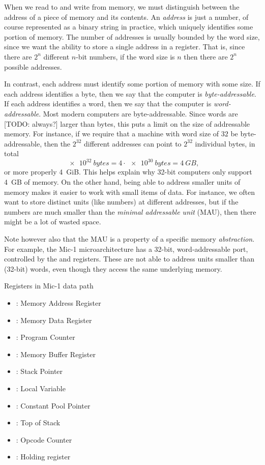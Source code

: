\documentclass[article, a4paper, 11pt, oneside]{memoir}
\numberwithin{equation}{chapter}
\begin{document}
\begin{notelist}
When we read to and write from memory, we must distinguish between the address of a piece of memory and its contents. An \emph{address} is just a number, of course represented as a binary string in practice, which uniquely identifies some portion of memory. The number of addresses is usually bounded by the word size, since we want the ability to store a single address in a register. That is, since there are $2^n$ different $n$-bit numbers, if the word size is $n$ then there are $2^n$ possible addresses.

In contrast, each address must identify some portion of memory with some size. If each address identifies a byte, then we say that the computer is \emph{byte-addressable}. If each address identifies a word, then we say that the computer is \emph{word-addressable}. Most modern computers are byte-addressable. Since words are [TODO: always?] larger than bytes, this puts a limit on the size of addressable memory. For instance, if we require that a machine with word size of $32$ be byte-addressable, then the $2^{32}$ different addresses can point to $2^{32}$ individual bytes, in total
%
\begin{equation*}
    \SI[exponent-base=2]{e32}{bytes}
        = 4 \cdot \SI[exponent-base=2]{e30}{bytes}
        = \SI{4}{GB},
\end{equation*}
%
or more properly \SI{4}{GiB}. This helps explain why 32-bit computers only support \SI{4}{GB} of memory. On the other hand, being able to address smaller units of memory makes it easier to work with small items of data. For instance, we often want to store distinct units (like numbers) at different addresses, but if the numbers are much smaller than the \emph{minimal addressable unit} (MAU), then there might be a lot of wasted space.

Note however also that the MAU is a property of a specific memory \emph{abstraction}. For example, the Mic-1 microarchitecture has a 32-bit, word-addressable port, controlled by the  and  registers. These are not able to address units smaller than (32-bit) words, even though they access the same underlying memory.


\item[Registers in Mic-1 data path]
~
%
\begin{itemize}
    \item {}: Memory Address Register
    \item {}: Memory Data Register
    \item {}: Program Counter
    \item {}: Memory Buffer Register
    \item {}: Stack Pointer
    \item {}: Local Variable
    \item {}: Constant Pool Pointer
    \item {}: Top of Stack
    \item {}: Opcode Counter
    \item {}: Holding register
\end{itemize}


\end{notelist}
\end{document}
